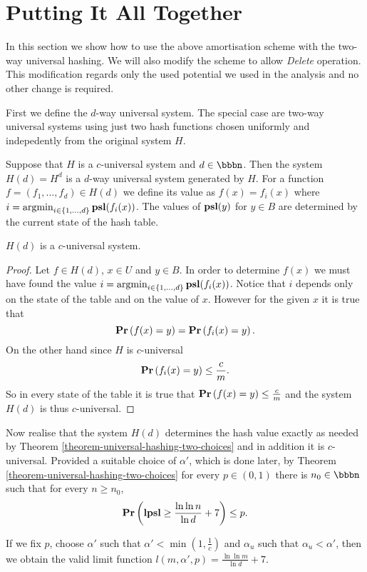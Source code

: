 \section{Putting It All Together}
In this section we show how to use the above amortisation scheme with the two-way universal hashing. We will also modify the scheme to allow \emph{Delete} operation. This modification regards only the used potential we used in the analysis and no other change is required.

First we define the $d$-way universal system. The special case are two-way universal systems using just two hash functions chosen uniformly and indepedently from the original system $H$.
\begin{definition} 
Suppose that $H$ is a $c$-universal system and $d \in \bbbn$. Then the system $H(d) = H^d$ is a $d$-way universal system generated by $H$. For a function $f = (f_1, \dots, f_d) \in H(d)$ we define its value as $f(x) = f_i(x)$ where $i = \operatorname{argmin}_{i \in \{1, \dots, d\}} \mathbf{psl}(f_i(x))$. The values of $\mathbf{psl}(y)$ for $y \in B$ are determined by the current state of the hash table.
\end{definition}

\begin{lemma}
$H(d)$ is a $c$-universal system.
\begin{proof}
Let $f \in H(d)$, $x \in U$ and $y \in B$. In order to determine $f(x)$ we must have found the value $i = \operatorname{argmin}_{i \in \{1, \dots, d\}} \mathbf{psl}(f_i(x))$. Notice that $i$ depends only on the state of the table and on the value of $x$. However for the given $x$ it is true that \[ \mathbf{Pr}\left(f(x) = y\right) = \mathbf{Pr}\left(f_i(x) = y\right). \] On the other hand since $H$ is $c$-universal \[ \mathbf{Pr}\left(f_i(x) = y\right) \leq \frac{c}{m}. \] So in every state of the table it is true that $\mathbf{Pr}\left(f(x) = y\right) \leq \frac{c}{m}$ and the system $H(d)$ is thus $c$-universal.
\end{proof}
\end{lemma}

Now realise that the system $H(d)$ determines the hash value exactly as needed by Theorem \ref{theorem-universal-hashing-two-choices} and in addition it is $c$-universal. Provided a suitable choice of $\alpha'$, which is done later, by Theorem \ref{theorem-universal-hashing-two-choices} for every $p \in (0, 1)$ there is $n_0 \in \bbbn$ such that for every $n \geq n_0$,
\[
	\mathbf{Pr}\left(\mathbf{lpsl} \geq \frac{\ln \ln n}{\ln d} + 7\right) \leq p.
\]

If we fix $p$, choose $\alpha'$ such that $\alpha' < \min(1, \frac{1}{c})$ and $\alpha_u$ such that $\alpha_u < \alpha'$, then we obtain the valid limit function $l(m, \alpha', p) = \frac{\ln \ln m}{\ln d} + 7$. 


